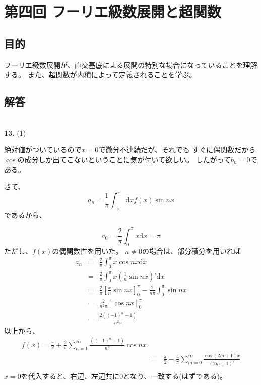 \documentclass{jarticle}
\newcommand{\diff}{\mathrm d}
\newcommand{\ans}[2]{\noindent\\ {\bf \large #1.} (#2)}
\begin{document}
\newpage
\section{第四回 フーリエ級数展開と超関数}

\subsection{目的}
フーリエ級数展開が、直交基底による展開の特別な場合になっていることを理解する。
また、超関数が内積によって定義されることを学ぶ。

\subsection{解答}

\ans{13}{1}

絶対値がついているので$x=0$で微分不連続だが、それでも
すぐに偶関数だから$\cos$の成分しか出てこないということに気が付いて欲しい。
したがって$b_n = 0$である。

さて、
\begin{equation}
  a_n = \frac{1}{ \pi} \int_{-\pi}^{\pi} \!\!\! \diff x f(x) \sin nx
\end{equation}
であるから、

\begin{equation}
  a_0 = \frac{2}{\pi} \int_0^{\pi} x \diff x  = \pi
\end{equation}
ただし、$f(x)$の偶関数性を用いた。
$n\neq 0$の場合は、部分積分を用いれば
\begin{eqnarray}
  a_n &=& \frac{2}{\pi} \int_0^{\pi} x \cos nx \diff x \\
  &=& \frac{2}{\pi} \int_0^{\pi} x (\frac{1}{n}\sin nx)' \diff x  \\
  &=& \frac{2}{\pi} \left[ \frac{x}{n} \sin nx \right]_0^{\pi}
  - \frac{2}{n\pi} \int_0^{\pi} \sin nx \\
  &=& \frac{2}{n^2\pi} \left[\cos nx \right]_0^{\pi}\\
  &=& \frac{2 ((-1)^n -1)}{n^2\pi}
\end{eqnarray}
以上から、
\begin{eqnarray}
  f(x) = \frac{\pi}{2} + \frac{2}{\pi} \sum_{n=1}^\infty \frac{((-1)^n -1)}{n^2} \cos nx \\
  &=&
  \frac{\pi}{2} - \frac{4}{\pi} \sum_{m=0}^\infty \frac{\cos (2m+1)x}{(2m+1)^2} \\
\end{eqnarray}
$x=0$を代入すると、右辺、左辺共に$0$となり、一致する(はずである)。
\end{document}
